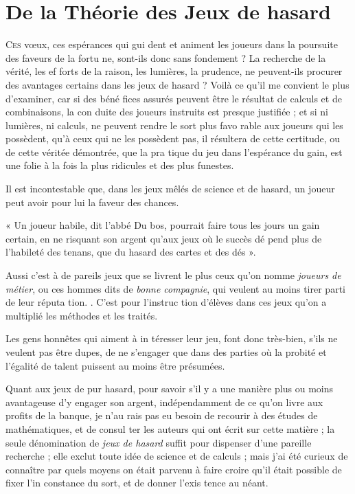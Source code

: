 \chapter{De la Théorie des Jeux de hasard}

\lettrine{C}{es} vœux, ces espérances qui gui%
dent et animent les joueurs dans la
poursuite des faveurs de la fortu%
ne, sont-ils donc sans fondement ?
La recherche de la vérité, les ef%
forts de la raison, les lumières, la
prudence, ne peuvent-ils procurer
des avantages certains dans les jeux
de hasard ? Voilà ce qu'il me convient
le plus d'examiner, car si des béné%
fices assurés peuvent être le résultat
de calculs et de combinaisons, la con%
duite des joueurs instruits est presque
justifiée ; et si ni lumières, ni calculs,
ne peuvent rendre le sort plus favo%
rable aux joueurs qui les possèdent,
qu'à ceux qui ne les possèdent pas,
il résultera de cette certitude, ou de
cette véritée démontrée, que la pra%
tique du jeu dans l'espérance du gain,
est une folie à la fois la plus ridicules
et des plus funestes.

Il est incontestable que, dans les
jeux mêlés de science et de hasard, un
joueur peut avoir pour lui la faveur
des chances.

« Un joueur habile, dit l'abbé Du%
bos, pourrait faire tous les jours un
gain certain, en ne risquant son
argent qu'aux jeux où le succès dé%
pend plus de l'habileté des tenans,
que du hasard des cartes et des
dés ».

Aussi c'est à de pareils jeux que se
livrent le plus ceux qu'on nomme
\emph{joueurs de métier}, ou ces hommes
dits de \emph{bonne compagnie}, qui veulent
au moins tirer parti de leur réputa%
tion. . C'est pour l'instruc%
tion d'élèves dans ces jeux qu'on a
multiplié les méthodes et les traités.

Les gens honnêtes qui aiment à in%
téresser leur jeu, font donc très-bien,
s'ils ne veulent pas être dupes, de ne
s'engager que dans des parties où la
probité et l'égalité de talent puissent
au moins être présumées.

Quant aux jeux de pur hasard, pour
savoir s'il y a une manière plus ou
moins avantageuse d'y engager son
argent, indépendamment de ce qu'on
livre aux profits de la banque, je n'au%
rais pas eu besoin de recourir à des
études de mathématiques, et de consul%
ter les auteurs qui ont écrit sur cette
matière ; la seule dénomination de
\emph{jeux de hasard} suffit pour dispenser 
d'une pareille recherche ; elle exclut
toute idée de science et de calculs ;
mais j'ai été curieux de connaître par
quels moyens on était parvenu à faire
croire qu'il était possible de fixer l'in%
constance du sort, et de donner l'exis%
tence au néant.

